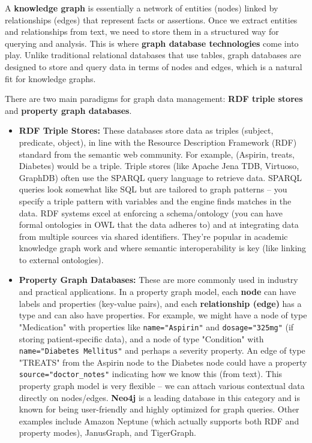 A \textbf{knowledge graph} is essentially a network of entities (nodes) linked by relationships (edges) that represent facts or assertions. Once we extract entities and relationships from text, we need to store them in a structured way for querying and analysis. This is where \textbf{graph database technologies} come into play. Unlike traditional relational databases that use tables, graph databases are designed to store and query data in terms of nodes and edges, which is a natural fit for knowledge graphs.

There are two main paradigms for graph data management: \textbf{RDF triple stores} and \textbf{property graph databases}.

\begin{itemize}
\item \textbf{RDF Triple Stores:} These databases store data as triples (subject, predicate, object), in line with the Resource Description Framework (RDF) standard from the semantic web community. For example, (Aspirin, treats, Diabetes) would be a triple. Triple stores (like Apache Jena TDB, Virtuoso, GraphDB) often use the SPARQL query language to retrieve data. SPARQL queries look somewhat like SQL but are tailored to graph patterns – you specify a triple pattern with variables and the engine finds matches in the data. RDF systems excel at enforcing a schema/ontology (you can have formal ontologies in OWL that the data adheres to) and at integrating data from multiple sources via shared identifiers. They're popular in academic knowledge graph work and where semantic interoperability is key (like linking to external ontologies).

\item \textbf{Property Graph Databases:} These are more commonly used in industry and practical applications. In a property graph model, each \textbf{node} can have labels and properties (key-value pairs), and each \textbf{relationship (edge)} has a type and can also have properties. For example, we might have a node of type "Medication" with properties like \texttt{name="Aspirin"} and \texttt{dosage="325mg"} (if storing patient-specific data), and a node of type "Condition" with \texttt{name="Diabetes Mellitus"} and perhaps a severity property. An edge of type "TREATS" from the Aspirin node to the Diabetes node could have a property \texttt{source="doctor\_notes"} indicating how we know this (from text). This property graph model is very flexible – we can attach various contextual data directly on nodes/edges. \textbf{Neo4j} is a leading database in this category and is known for being user-friendly and highly optimized for graph queries. Other examples include Amazon Neptune (which actually supports both RDF and property modes), JanusGraph, and TigerGraph.
\end{itemize}

